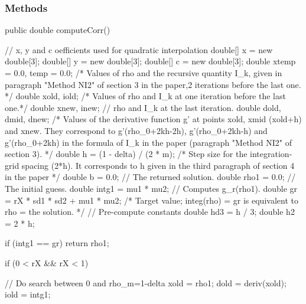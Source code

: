 \subsubsection* {Methods}
\begin{code}

   public double computeCorr()\begin{hide}
   {
      // x, y and c oefficients used for quadratic interpolation
      double[] x = new double[3];
      double[] y = new double[3];
      double[] c = new double[3];
      double xtemp = 0.0, temp = 0.0; /* Values of rho and the recursive
      					   quantity I_k, given in paragraph
      					   "Method NI2" of section 3 in
      					   the paper,2 iterations before the
      					   last one. */
      double xold, iold; /* Values of rho and I_k at one iteration before
      			      the last one.*/
      double xnew, inew; // rho and I_k at the last iteration.
      double dold, dmid, dnew; /* Values of the derivative function g'
      				   at points xold, xmid (xold+h) and xnew.
      				   They correspond to g'(rho_0+2kh-2h),
      				   g'(rho_0+2kh-h) and g'(rho_0+2kh) in the
      				   formula of I_k in the paper
      				   (paragraph "Method NI2" of section 3). */
      double h = (1 - delta) / (2 * m); /* Step size for the
      					 integration-grid spacing (2*h).
      					 It corresponds to h given in
      					 the third paragraph of
      					 section 4 in the paper */
      double b = 0.0; // The returned solution.
      double rho1 = 0.0; // The initial guess.
      double intg1 = mu1 * mu2; // Computes g_r(rho1).
      double gr = rX * sd1 * sd2 + mu1 * mu2; /* Target value; integ(rho)
      						   = gr is equivalent to
      						   rho = the solution. */
      // Pre-compute constants
      double hd3 = h / 3;
      double h2 = 2 * h;

      if (intg1 == gr)
         return rho1;

      if (0 < rX && rX < 1) { // Do search between 0 and rho_m=1-delta
         xold = rho1;
         dold = deriv(xold);
         iold = intg1;

}}
\end{hide}
\end{code}
